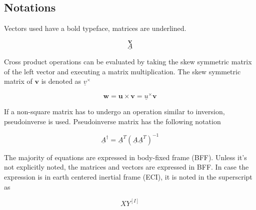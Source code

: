 \subsection{Notations}

Vectors used have a bold typeface, matrices are underlined. 

\begin{equation*}
\textbf{v}
\end{equation*}
\begin{equation*}
\underline{A}
\end{equation*}

Cross product operations can be evaluated by taking the skew symmetric matrix of the left vector and executing a matrix multiplication. The skew symmetric matrix of $\textbf{v}$ is denoted as $\underline{v}^\times$

\begin{equation*}
	\textbf{w} = \textbf{u} \times \textbf{v} = \underline{u}^\times \textbf{v}
\end{equation*}

If a non-square matrix has to undergo an operation similar to inversion, pseudoinverse is used. Pseudoinverse matrix has the following notation

\begin{equation*}
 \underline{A}^\dagger    =  \underline{A}^T  (\underline{A} \underline{A}^T)^{-1}
\end{equation*}

The majority of equations are expressed in body-fixed frame (BFF). Unless it's not explicitly noted, the matrices and vectors are expressed in BFF. In case the expression is in earth centered inertial frame (ECI), it is noted in the superscript as 

\begin{equation*}
XY^{[I]}
\end{equation*}